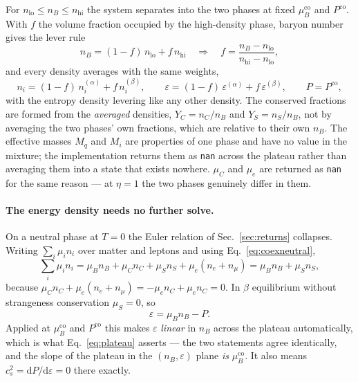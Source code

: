 \documentclass[aps,prc,onecolumn,superscriptaddress,nofootinbib,10pt]{revtex4-2}
\newcommand{\nB}{n_B}
\newcommand{\nC}{n_C}
\newcommand{\nS}{n_S}
\newcommand{\muB}{\mu_B}
\newcommand{\muC}{\mu_C}
\newcommand{\muS}{\mu_S}
\begin{document}
For $n_{\text{lo}} \le \nB \le n_{\text{hi}}$ the system separates into the two
phases at fixed $\muB^{\text{co}}$ and $P^{\text{co}}$. With $f$ the volume
fraction occupied by the high-density phase, baryon number gives the lever rule
\begin{equation}
  \nB = (1 - f)\, n_{\text{lo}} + f\, n_{\text{hi}}
  \quad\Longrightarrow\quad
  f = \frac{\nB - n_{\text{lo}}}{n_{\text{hi}} - n_{\text{lo}}},
  \label{eq:lever}
\end{equation}
and every density averages with the same weights,
\begin{equation}
  n_i = (1 - f)\, n_i^{(\alpha)} + f\, n_i^{(\beta)},
  \qquad
  \varepsilon = (1 - f)\, \varepsilon^{(\alpha)} + f\, \varepsilon^{(\beta)},
  \qquad
  P = P^{\text{co}},
  \label{eq:plateau}
\end{equation}
with the entropy density levering like any other density. The conserved
fractions are formed from the
\emph{averaged} densities, $Y_C = \nC/\nB$ and $Y_S = \nS/\nB$, not by
averaging the two phases' own fractions, which are relative to their own
$\nB$. The effective masses $M_q$ and $M_i$ are properties of one phase and
have no value in the mixture; the implementation returns them as
\texttt{nan} across the plateau rather than averaging them into a state that
exists nowhere. $\muC$ and $\mu_e$ are returned as \texttt{nan} for the same
reason --- at $\eta = 1$ the two phases genuinely differ in them.

\paragraph{The energy density needs no further solve.} On a neutral phase at
$T = 0$ the Euler relation of Sec.~\ref{sec:returns} collapses. Writing
$\sum_i \mu_i n_i$ over matter and leptons and using
Eq.~\eqref{eq:coexneutral},
\begin{equation}
  \sum_i \mu_i n_i
  = \muB \nB + \muC \nC + \muS \nS + \mu_e (n_e + n_\mu)
  = \muB \nB + \muS \nS,
  \label{eq:eulerneutral}
\end{equation}
because $\muC \nC + \mu_e (n_e + n_\mu) = -\mu_e \nC + \mu_e \nC = 0$. In
$\beta$ equilibrium without strangeness conservation $\muS = 0$, so
\begin{equation}
  \varepsilon = \muB \nB - P .
  \label{eq:epsneutral}
\end{equation}
Applied at $\muB^{\text{co}}$ and $P^{\text{co}}$ this makes $\varepsilon$
\emph{linear} in $\nB$ across the plateau automatically, which is what
Eq.~\eqref{eq:plateau} asserts --- the two statements agree identically, and
the slope of the plateau in the $(\nB, \varepsilon)$ plane \emph{is}
$\muB^{\text{co}}$. It also means $c_s^2 = \mathrm{d} P/\mathrm{d}\varepsilon = 0$ there
exactly.
\end{document}
